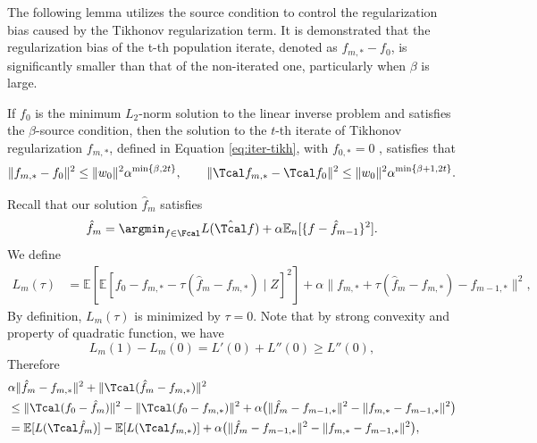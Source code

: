 \documentclass[12pt]{extarticle} %
\begin{document}
The following lemma utilizes the source condition to  control the regularization bias caused by the
Tikhonov regularization term.  It is demonstrated that the regularization bias of the t-th population iterate, denoted as $f_{m,*} - f_0$, is significantly smaller than that of the non-iterated one, particularly when $\beta$ is large.
\begin{lemma}\label{lem:iter-tikh-bias}
    If $f_0$ is the minimum $L_2$-norm solution to the linear inverse problem and satisfies the $\beta$-source condition, then the solution to the $t$-th iterate of Tikhonov
regularization $f_{m,*}$, defined in Equation \eqref{eq:iter-tikh}, with $f_{0,*}= 0$ , satisfies that
$$
\|f_{m,*} - f_0\|^2 \leq \|w_0\|^2 \alpha^{\min\{\beta, 2t\}}, \qquad\|\Tcal f_{m,*} - \Tcal f_0\|^2 \leq \|w_0\|^2 \alpha^{\min\{\beta+1, 2t\}}.
$$
\end{lemma}
Recall that our solution $\hat{f}_{m}$ satisfies $$
\hat{f}_m = \argmin_{f\in\Fcal} L(\hat{\Tcal}f) + \alpha \mathbb{E}_n [\{f - \hat{f}_{m-1}\}^2].
$$
We define \begin{align*}
L_m(\tau) &= \mathbb{E}[\mathbb{E}[f_0 - f_{m,*} - \tau (\hat{f}_m - f_{m,*})\mid Z]^2]+\alpha \|f_{m,*} + \tau (\hat{f}_m - f_{m,*}) - f_{m-1,*}\|^2,
\end{align*}
By definition, $L_m(\tau)$ is minimized by $\tau = 0$. Note that by strong convexity and property of quadratic function, we have $$
L_m(1) - L_m(0) = L'(0) + L''(0) \geq L''(0),
$$
Therefore \begin{align*}
    &\alpha \|\hat{f}_m - f_{m,*}\|^2 + \|\Tcal(\hat{f}_m - f_{m,*})\|^2\\
    & \leq\|\Tcal(f_0 - \hat{f}_m)\|^2 - \|\Tcal(f_0 - f_{m,*})\|^2 + \alpha\big(\|\hat{f}_m - f_{m-1,*}\|^2 - \|f_{m,*} - f_{m-1,*}\|^2\big)\\
    & =\mathbb{E}[L(\Tcal\hat{f}_m)] - \mathbb{E}[L(\Tcal f_{m,*})]+ \alpha\big(\|\hat{f}_m - f_{m-1,*}\|^2 - \|f_{m,*} - f_{m-1,*}\|^2\big),\\
\end{align*}
\end{document}
